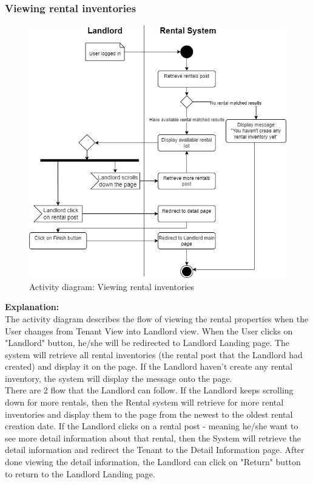 \subsubsection{Viewing rental inventories}
\begin{figure}[H]
    \centering
    \includegraphics[width=0.9 
    \textwidth]{Images/Activity/ac_diag_view_landlord.png}
    \caption{Activity diagram: Viewing rental inventories}
    \label{fig:viewing-rental-landlord}
\end{figure}
\noindent \textbf{Explanation:}\\
The activity diagram describes the flow of viewing the rental properties when the User changes from Tenant View into Landlord view. When the User clicks on "Landlord" button, he/she will be redirected to Landlord Landing page. The system will retrieve all rental inventories (the rental post that the Landlord had created) and display it on the page. If the Landlord haven't create any rental inventory, the system will display the message onto the page. \\
There are 2 flow that the Landlord can follow. If the Landlord keeps scrolling down for more rentals, then the Rental system will retrieve for more rental inventories and display them to the page from the newest to the oldest rental creation date. If the Landlord clicks on a rental post - meaning he/she want to see more detail information about that rental, then the System will retrieve the detail information and redirect the Tenant to the Detail Information page. After done viewing the detail information, the Landlord can click on "Return" button to return to the Landlord Landing page. 


